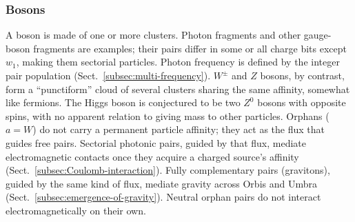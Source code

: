 \documentclass{ijuc}
\begin{document}
\subsubsection{Bosons}\label{bosons}
A boson is made of one or more clusters. Photon fragments and other gauge-boson fragments are examples; their pairs differ in some or all charge bits except $w_1$, making them sectorial particles. Photon frequency is defined by the integer pair population (Sect.~\ref{subsec:multi-frequency}).
$W^{\pm}$ and $Z$ bosons, by contrast, form a ``punctiform'' cloud of several clusters sharing the same affinity, somewhat like fermions. The Higgs boson is conjectured to be two $Z^0$ bosons with opposite spins, with no apparent relation to giving mass to other particles.
Orphans ($a=W$) do not carry a permanent particle affinity; they act as the flux that guides free pairs. Sectorial photonic pairs, guided by that flux, mediate electromagnetic contacts once they acquire a charged source's affinity (Sect.~\ref{subsec:Coulomb-interaction}). Fully complementary pairs (gravitons), guided by the same kind of flux, mediate gravity across Orbis and Umbra (Sect.~\ref{subsec:emergence-of-gravity}). Neutral orphan pairs do not interact electromagnetically on their own.
\end{document}
